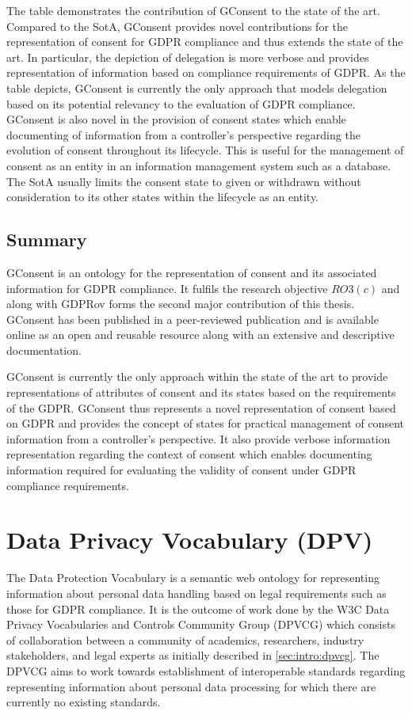 The table demonstrates the contribution of GConsent to the state of the art. 
Compared to the SotA, GConsent provides novel contributions for the representation of consent for GDPR compliance and thus extends the state of the art.
In particular, the depiction of delegation is more verbose and provides representation of information based on compliance requirements of GDPR.
As the table depicts, GConsent is currently the only approach that models delegation based on its potential relevancy to the evaluation of GDPR compliance.
GConsent is also novel in the provision of consent states which enable documenting of information from a controller's perspective regarding the evolution of consent throughout its lifecycle. This is useful for the management of consent as an entity in an information management system such as a database.
The SotA usually limits the consent state to given or withdrawn without consideration to its other states within the lifecycle as an entity.

\subsection*{Summary}
GConsent is an ontology for the representation of consent and its associated information for GDPR compliance. It fulfils the research objective $RO3(c)$ and along with GDPRov forms the second major contribution of this thesis.
GConsent has been published in a peer-reviewed publication and is available online as an open and reusable resource along with an extensive and descriptive documentation.

GConsent is currently the only approach within the state of the art to provide representations of attributes of consent and its states based on the requirements of the GDPR.
GConsent thus represents a novel representation of consent based on GDPR and provides the concept of states for practical management of consent information from a controller's perspective. It also provide verbose information representation regarding the context of consent which enables documenting information required for evaluating the validity of consent under GDPR compliance requirements.

\section{Data Privacy Vocabulary (DPV)}\label{sec:voc:DPV}
The Data Protection Vocabulary \cite{pandit_creating_2019} is a semantic web ontology for representing information about personal data handling based on legal requirements such as those for GDPR compliance.
It is the outcome of work done by the W3C Data Privacy Vocabularies and Controls Community Group (DPVCG) which consists of collaboration between a community of academics, researchers, industry stakeholders, and legal experts as initially described in \autoref{sec:intro:dpvcg}.
The DPVCG aims to work towards establishment of interoperable standards regarding representing information about personal data processing for which there are currently no existing standards.

